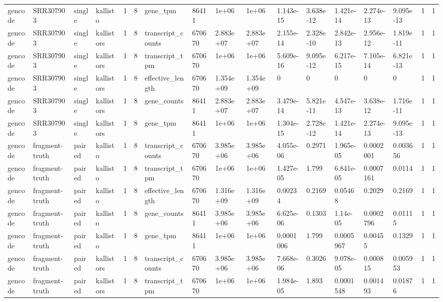 \begin{tabular}{lllllllllllllllll}
gencode & SRR307903 & single & kallisto & 1 & 8 & gene\_tpm & 86411 & 1e+06 & 1e+06 & 1.143e-15 & 3.638e-12 & 1.421e-14 & 2.274e-13 & 9.095e-13 & 1 & 1 \\
gencode & SRR307903 & single & kallistors & 1 & 8 & transcript\_counts & 670670 & 2.883e+07 & 2.883e+07 & 2.155e-14 & 2.328e-10 & 2.842e-13 & 2.956e-12 & 1.819e-11 & 1 & 1 \\
gencode & SRR307903 & single & kallistors & 1 & 8 & transcript\_tpm & 670670 & 1e+06 & 1e+06 & 5.609e-16 & 9.095e-12 & 6.217e-15 & 7.105e-14 & 6.821e-13 & 1 & 1 \\
gencode & SRR307903 & single & kallistors & 1 & 8 & effective\_length & 670670 & 1.354e+09 & 1.354e+09 & 0 & 0 & 0 & 0 & 0 & 1 & 1 \\
gencode & SRR307903 & single & kallistors & 1 & 8 & gene\_counts & 86411 & 2.883e+07 & 2.883e+07 & 3.479e-14 & 5.821e-11 & 4.547e-13 & 3.638e-12 & 1.716e-11 & 1 & 1 \\
gencode & SRR307903 & single & kallistors & 1 & 8 & gene\_tpm & 86411 & 1e+06 & 1e+06 & 1.304e-15 & 2.728e-12 & 1.421e-14 & 2.274e-13 & 9.095e-13 & 1 & 1 \\
gencode & fragment-truth & paired & kallisto & 1 & 8 & transcript\_counts & 670670 & 3.985e+06 & 3.985e+06 & 4.055e-06 & 0.2971 & 1.965e-05 & 0.0002001 & 0.003656 & 1 & 1 \\
gencode & fragment-truth & paired & kallisto & 1 & 8 & transcript\_tpm & 670670 & 1e+06 & 1e+06 & 1.427e-05 & 1.799 & 6.841e-05 & 0.0007161 & 0.0114 & 1 & 1 \\
gencode & fragment-truth & paired & kallisto & 1 & 8 & effective\_length & 670670 & 1.316e+09 & 1.316e+09 & 0.00234 & 0.2169 & 0.05468 & 0.2029 & 0.2169 & 1 & 1 \\
gencode & fragment-truth & paired & kallisto & 1 & 8 & gene\_counts & 86411 & 3.985e+06 & 3.985e+06 & 6.625e-06 & 0.1303 & 1.14e-05 & 0.0002796 & 0.01115 & 1 & 1 \\
gencode & fragment-truth & paired & kallisto & 1 & 8 & gene\_tpm & 86411 & 1e+06 & 1e+06 & 0.0001006 & 1.799 & 0.0005967 & 0.00455 & 0.1329 & 1 & 1 \\
gencode & fragment-truth & paired & kallistors & 1 & 8 & transcript\_counts & 670670 & 3.985e+06 & 3.985e+06 & 7.668e-06 & 0.3026 & 9.078e-05 & 0.000815 & 0.005953 & 1 & 1 \\
gencode & fragment-truth & paired & kallistors & 1 & 8 & transcript\_tpm & 670670 & 1e+06 & 1e+06 & 1.984e-05 & 1.893 & 0.0001548 & 0.001493 & 0.01876 & 1 & 1 \\

\end{tabular}
